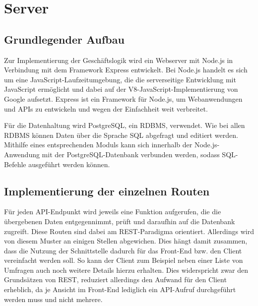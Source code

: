 \section{Server}

\subsection{Grundlegender Aufbau}
Zur Implementierung der Geschäftslogik wird ein Webserver mit Node.js in Verbindung mit dem Framework Express entwickelt.
Bei Node.js handelt es sich um eine JavaScript-Laufzeitumgebung, die die serverseitige Entwicklung mit JavaScript ermöglicht und dabei auf der V8-JavaScript-Implementierung von Google aufsetzt.\autocite[Vgl.][]{nl-openjsfoundation2020nodejs}
Express ist ein Framework für Node.js, um Webanwendungen und \acsp{API} zu entwickeln und wegen der Einfachheit weit verbreitet.\autocite[Vgl.][]{nl-strongloop2017express}

Für die Datenhaltung wird PostgreSQL, ein \ac{RDBMS}, verwendet.
Wie bei allen \acs{RDBMS} können Daten über die Sprache \acs{SQL} abgefragt und editiert werden. %
Mithilfe eines entsprechenden Moduls kann sich innerhalb der Node.js-Anwendung mit der PostgreSQL-Datenbank verbunden werden, sodass \acs{SQL}-Befehle ausgeführt werden können.\autocite[Vgl.][]{nl-carlson2020nodepostgres}

\subsection{Implementierung der einzelnen Routen}
Für jeden \acs{API}-Endpunkt wird jeweils eine Funktion aufgerufen, die die übergebenen Daten entgegennimmt, prüft und daraufhin auf die Datenbank zugreift.
Diese Routen sind dabei am \acs{REST}-Paradigma orientiert.
Allerdings wird von diesem Muster an einigen Stellen abgewichen.
Dies hängt damit zusammen, dass die Nutzung der Schnittstelle dadurch für das Front-End bzw. den Client vereinfacht werden soll.
So kann der Client zum Beispiel neben einer Liste von Umfragen auch noch weitere Details hierzu erhalten.
Dies widerspricht zwar den Grundsätzen von \acs{REST}, reduziert allerdings den Aufwand für den Client erheblich, da je Ansicht im Front-End lediglich ein \acs{API}-Aufruf durchgeführt werden muss und nicht mehrere.

